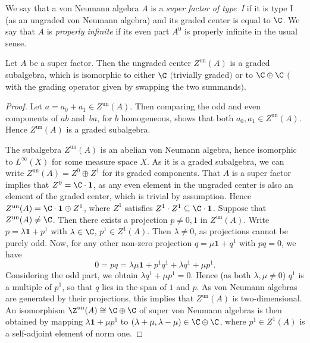 \begin{Definition}
We say that a von Neumann algebra $A$ is a \emph{super factor of type~I} if it is type I (as an ungraded von Neumann algebra) and its graded center is equal to $\C$.
We say that $A$ is \emph{properly infinite} if its even part $A^0$ is properly infinite in the usual sense.
\end{Definition}


\begin{Lemma}
\label{LemmaCenterOfSuperFactor}
 Let $A$ be a super factor.
 Then the ungraded center $Z^{\mathrm{un}}(A)$ is a graded subalgebra, which is isomorphic to either $\C$ $($trivially graded$)$ or to $\C \oplus \C$ $($with the grading operator given by swapping the two summands$)$.
\end{Lemma}

\begin{proof}
Let $a = a_0 + a_1 \in Z^{\mathrm{un}}(A)$.
Then comparing the odd and even components of $ab$ and~$ba$, for $b$ homogeneous, shows that both $a_0, a_1 \in Z^{\mathrm{un}}(A)$.
Hence $Z^{\mathrm{un}}(A)$ is a graded subalgebra.

The subalgebra $Z^{\mathrm{un}}(A)$ is an abelian von Neumann algebra, hence isomorphic to $L^\infty(X)$ for some measure space $X$.
As it is a graded subalgebra, we can write $Z^{\mathrm{un}}(A) = Z^0 \oplus Z^1$ for its graded components.
That $A$ is a super factor implies that $Z^0 = \C \cdot \mathbf{1}$, as any even element in the ungraded center is also an element of the graded center, which is trivial by assumption.
Hence $Z^{\mathrm{un}}(A) = \C\cdot \mathbf{1} \oplus Z^1$, where $Z^1$ satisfies $Z^1 \cdot Z^1 \subseteq \C\cdot \mathbf{1}$.
Suppose that $Z^{\mathrm{un}}(A) \neq \C$.
Then there exists a projection $p \neq 0, 1$ in $Z^{\mathrm{un}}(A)$.
Write $p = \lambda \mathbf{1} + p^1$ with $\lambda \in \C$, $p^1 \in Z^1(A)$.
Then $\lambda \neq 0$, as projections cannot be purely odd.
Now, for any other non-zero projection $q = \mu \mathbf{1} + q^1$ with $pq = 0$, we have
\begin{equation*}
 0 = pq = \lambda \mu \mathbf{1} + p^1q^1 + \lambda q^1 + \mu p^1.
\end{equation*}
Considering the odd part, we obtain $\lambda q^1 + \mu p^1 = 0$.
Hence (as both $\lambda, \mu \neq 0$) $q^1$ is a multiple of $p^1$, so that $q$ lies in the span of $1$ and $p$.
As von Neumann algebras are generated by their projections, this implies that $Z^{\mathrm{un}}(A)$ is two-dimensional.
An isomorphism $\Z^{\mathrm{un}}(A) \cong \C \oplus \C$ of super von Neumann algebras is then obtained by mapping $\lambda \mathbf{1} + \mu p^1$ to $(\lambda + \mu, \lambda - \mu) \in \C \oplus\C$, where $p^1 \in Z^1(A)$ is a self-adjoint element of norm one.
\end{proof}

